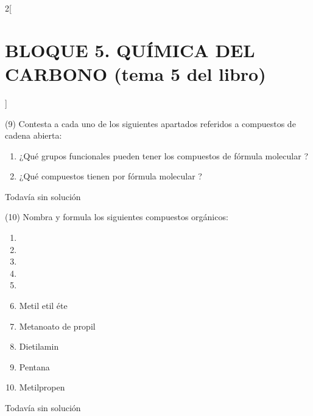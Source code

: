 \documentclass[10pt]{article}
\begin{document}
\begin{multicols}{2}[
  \section{BLOQUE 5. QUÍMICA DEL CARBONO (tema 5 del libro)}
  ]
\begin{exercise}[
    tags    = {},
    topics  = {química,química básica},
    source  = {FQ 1B MGH 2016, p85, e26},
  ]
  (9) Contesta a cada uno de los siguientes apartados referidos a
  compuestos de cadena abierta:
  \begin{enumerate}
    \item ¿Qué grupos funcionales pueden tener los compuestos de
    fórmula molecular ?
    \item ¿Qué compuestos tienen por fórmula molecular ?
  \end{enumerate}
\end{exercise}

\begin{solution}[print=false]
  Todavía sin solución
\end{solution}




\begin{exercise}[
    tags    = {},
    topics  = {química,química básica},
    source  = {FQ 1B MGH 2016, p85, e26},
  ]

  (10) Nombra y formula los siguientes compuestos orgánicos:
  \begin{enumerate}
    \item {}
    \item {}
    \item {}
    \item {}
    \item {}
    \item Metil etil éte
    \item Metanoato de propil
    \item Dietilamin
    \item Pentana
    \item Metilpropen
  \end{enumerate}
\end{exercise}

\begin{solution}[print=false]
  Todavía sin solución
\end{solution}




\begin{exercise}[
    tags    = {},
    topics  = {química,química básica},
    source  = {FQ 1B MGH 2016, p85, e26},
  ]


\end{exercise}
\end{multicols}
\end{document}
